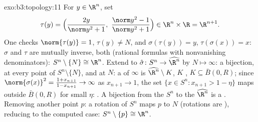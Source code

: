 \begin{solution}{exo:b3:topology:11}
For $y \in \R^n$, set
\[
\tau(y) = \Bigl(\frac{2y}{\norm y^2 + 1},\ \frac{\norm y^2 -
1}{\norm y^2 + 1}\Bigr) \in \R^n\times\R = \R^{n+1}.
\]
One checks $\norm{\tau(y)} = 1$, $\tau(y) \neq N$, and
$\sigma(\tau(y)) = y$, $\tau(\sigma(x)) = x$: $\sigma$ and
$\tau$ are mutually inverse, both  (rational formulas
with nonvanishing denominators): $S^n\setminus\{N\} \cong
\R^n$. Extend to $\hat\sigma \colon S^n \to \widehat{\R^n}$ by
$N \mapsto \infty$: a bijection,  at every point of
$S^n\setminus\{N\}$, and at $N$: a   of
$\infty$ is $\widehat{\R^n}\setminus K$, $K$ , $K
\subseteq \bar B(0, R)$; since $\norm{\sigma(x)}^2 = \frac{1 +
x_{n+1}}{1 - x_{n+1}} \to \infty$ as $x_{n+1} \to 1$, the set
$\{x \in S^n : x_{n+1} > 1 - \eta\}$ maps outside $\bar B(0,R)$
for small $\eta$: . A  bijection from the
 $S^n$ to the  $\widehat{\R^n}$ is a
. Removing another point $p$: a rotation of $S^n$
maps $p$ to $N$ (rotations are ), reducing to the
computed case: $S^n \setminus \{p\} \cong \R^n$.
\end{solution}

